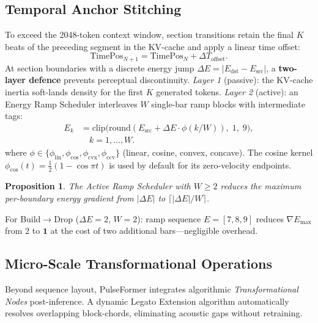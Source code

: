 \documentclass[conference]{IEEEtran}
\newtheorem{proposition}{Proposition}
\begin{document}
\subsection{Temporal Anchor Stitching}
\label{sec:stitching}
To exceed the 2048-token context window, section transitions retain the final $K$ beats of the preceding segment in the KV-cache and apply a linear time offset:
\begin{equation}
\mathrm{TimePos}_{N+1} = \mathrm{TimePos}_N + \Delta T_{\mathrm{offset}}.
\end{equation}
At section boundaries with a discrete energy jump $\Delta E = |E_{\mathrm{dst}}-E_{\mathrm{src}}|$, a \textbf{two-layer defence} prevents perceptual discontinuity. \emph{Layer 1} (passive): the KV-cache inertia soft-lands density for the first $K$ generated tokens. \emph{Layer 2} (active): an Energy Ramp Scheduler interleaves $W$ single-bar ramp blocks with intermediate tags:
\begin{align}
E_k &= \mathrm{clip}\!\bigl(\mathrm{round}(E_{\mathrm{src}}+\Delta E\cdot\phi(k/W)),\;1,\;9\bigr), \nonumber\\
    &\quad k=1,\dots,W.
\end{align}
{%
\sloppy
where $\phi\in\{\phi_{\mathrm{lin}},\phi_{\mathrm{cos}},\phi_{\mathrm{cvx}},\phi_{\mathrm{ccv}}\}$ (linear, cosine, convex, concave). The cosine kernel $\phi_{\mathrm{cos}}(t)=\tfrac{1}{2}(1-\cos\pi t)$ is used by default for its zero-velocity endpoints.
}

\begin{proposition}\label{prop:ramp}
The Active Ramp Scheduler with $W\geq 2$ reduces the maximum per-boundary energy gradient from $|\Delta E|$ to $\lceil|\Delta E|/W\rceil$.
\end{proposition}

For Build$\to$Drop ($\Delta E=2$, $W=2$): ramp sequence $E=[7,8,9]$ reduces $\nabla E_{\max}$ from $2$ to $\mathbf{1}$ at the cost of two additional bars—negligible overhead.


\subsection{Micro-Scale Transformational Operations}
Beyond sequence layout, PulseFormer integrates algorithmic \emph{Transformational Nodes} post-inference. A dynamic Legato Extension algorithm automatically resolves overlapping block-chords, eliminating acoustic gaps without retraining.
\end{document}

